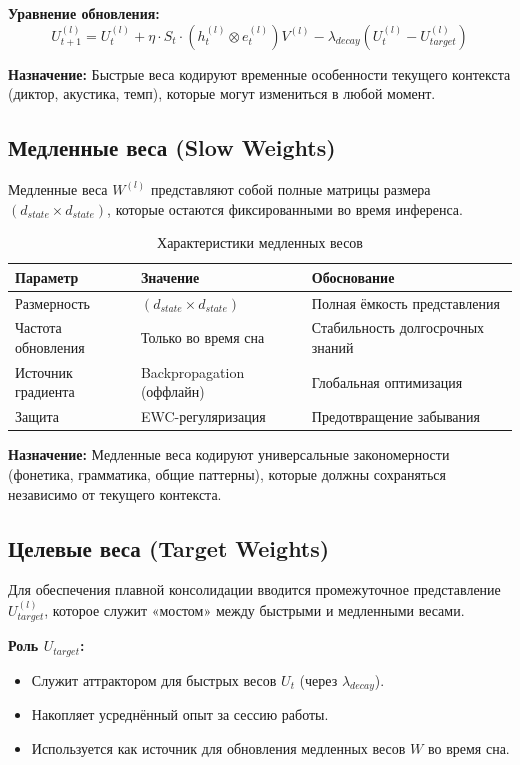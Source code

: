 \textbf{Уравнение обновления:}
\begin{equation}
U_{t+1}^{(l)} = U_t^{(l)} + \eta \cdot S_t \cdot \left(h_t^{(l)} \otimes e_t^{(l)}\right) V^{(l)} - \lambda_{decay} \left(U_t^{(l)} - U_{target}^{(l)}\right)
\label{eq:fast_weights_update}
\end{equation}

\textbf{Назначение:} Быстрые веса кодируют временные особенности текущего контекста (диктор, акустика, темп), которые могут измениться в любой момент.

\subsection{Медленные веса (Slow Weights)}

Медленные веса $W^{(l)}$ представляют собой полные матрицы размера $(d_{state} \times d_{state})$, которые остаются фиксированными во время инференса.

\begin{table}[h]
\centering
\caption{Характеристики медленных весов}
\label{tab:slow_weights}
\begin{tabular}{lp{5cm}p{4cm}}
\toprule
\textbf{Параметр} & \textbf{Значение} & \textbf{Обоснование} \\
\midrule
Размерность & $(d_{state} \times d_{state})$ & Полная ёмкость представления \\
Частота обновления & Только во время сна & Стабильность долгосрочных знаний \\
Источник градиента & Backpropagation (оффлайн) & Глобальная оптимизация \\
Защита & EWC-регуляризация & Предотвращение забывания \\
\bottomrule
\end{tabular}
\end{table}

\textbf{Назначение:} Медленные веса кодируют универсальные закономерности (фонетика, грамматика, общие паттерны), которые должны сохраняться независимо от текущего контекста.

\subsection{Целевые веса (Target Weights)}

Для обеспечения плавной консолидации вводится промежуточное представление $U_{target}^{(l)}$, которое служит «мостом» между быстрыми и медленными весами.

\textbf{Роль $U_{target}$:}
\begin{itemize}
    \item Служит аттрактором для быстрых весов $U_t$ (через $\lambda_{decay}$).
    \item Накопляет усреднённый опыт за сессию работы.
    \item Используется как источник для обновления медленных весов $W$ во время сна.
\end{itemize}

